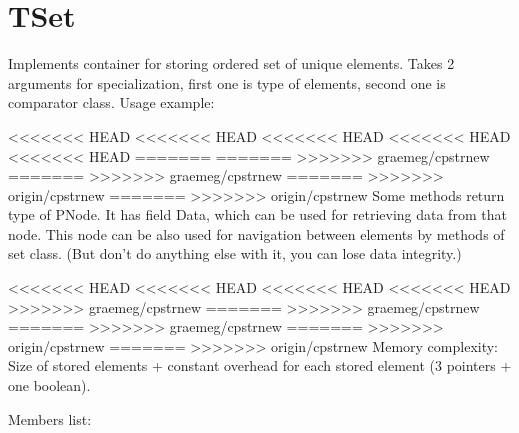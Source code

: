 \chapter{TSet}

Implements container for storing ordered set of unique elements.
Takes 2 arguments for specialization, first one is type of elements, second one is comparator class.
Usage example:



<<<<<<< HEAD
<<<<<<< HEAD
<<<<<<< HEAD
<<<<<<< HEAD
<<<<<<< HEAD
=======
=======
>>>>>>> graemeg/cpstrnew
=======
>>>>>>> graemeg/cpstrnew
=======
>>>>>>> origin/cpstrnew
=======
>>>>>>> origin/cpstrnew
Some methods return type of PNode. It has field Data, which can be used for retrieving data from
that node. This node can be also used for navigation between elements by methods of set class.
(But don't do anything else with it, you can lose data integrity.)

<<<<<<< HEAD
<<<<<<< HEAD
<<<<<<< HEAD
<<<<<<< HEAD
>>>>>>> graemeg/cpstrnew
=======
>>>>>>> graemeg/cpstrnew
=======
>>>>>>> graemeg/cpstrnew
=======
>>>>>>> origin/cpstrnew
=======
>>>>>>> origin/cpstrnew
Memory complexity:
Size of stored elements + constant overhead for each stored element (3 pointers + one boolean).

Members list:

